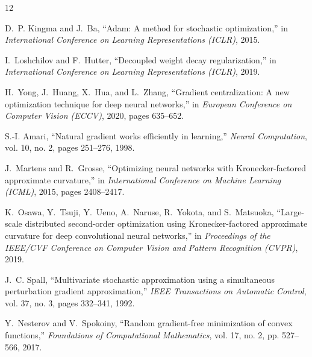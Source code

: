 \documentclass[conference]{IEEEtran}
\begin{document}

\begin{thebibliography}{12}

D.~P. Kingma and J.~Ba, ``Adam: A method for stochastic optimization,'' in \emph{International Conference on Learning Representations (ICLR)}, 2015.

I.~Loshchilov and F.~Hutter, ``Decoupled weight decay regularization,'' in \emph{International Conference on Learning Representations (ICLR)}, 2019.

H.~Yong, J.~Huang, X.~Hua, and L.~Zhang, ``Gradient centralization: A new optimization technique for deep neural networks,'' in \emph{European Conference on Computer Vision (ECCV)}, 2020, pages 635--652.

S.-I. Amari, ``Natural gradient works efficiently in learning,'' \emph{Neural Computation}, vol. 10, no. 2, pages 251--276, 1998.

J.~Martens and R.~Grosse, ``Optimizing neural networks with Kronecker-factored approximate curvature,'' in \emph{International Conference on Machine Learning (ICML)}, 2015, pages 2408--2417.

K.~Osawa, Y.~Tsuji, Y.~Ueno, A.~Naruse, R.~Yokota, and S.~Matsuoka, ``Large-scale distributed second-order optimization using Kronecker-factored approximate curvature for deep convolutional neural networks,'' in \emph{Proceedings of the IEEE/CVF Conference on Computer Vision and Pattern Recognition (CVPR)}, 2019.

J.~C. Spall, ``Multivariate stochastic approximation using a simultaneous perturbation gradient approximation,'' \emph{IEEE Transactions on Automatic Control}, vol. 37, no. 3, pages 332--341, 1992.

Y.~Nesterov and V.~Spokoiny, ``Random gradient-free minimization of convex functions,'' \emph{Foundations of Computational Mathematics}, vol. 17, no. 2, pp. 527--566, 2017.



\end{thebibliography}
\end{document}
